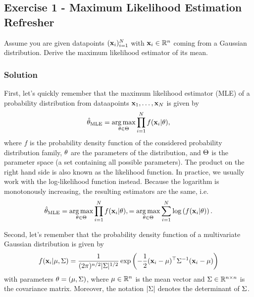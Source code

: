 \documentclass[
  letterpaper,
  DIV=11,
  numbers=noendperiod]{scrartcl}
\author{}
\date{}
\begin{document}
\subsection{Exercise 1 - Maximum Likelihood Estimation
Refresher}\label{exercise-1---maximum-likelihood-estimation-refresher}

Assume you are given datapoints \((\mathbf{x}_i)_{i=1}^N\) with
\(\mathbf{x}_i\in\mathbb{R}^n\) coming from a Gaussian distribution. Derive the maximum
likelihood estimator of its mean.

\subsubsection{Solution}\label{solution}

First, let's quickly remember that the maximum likelihood estimator
(MLE) of a probability distribution from dataapoints
\(\mathbf{x}_1, \ldots, \mathbf{x}_N\) is given by \[
\hat{\theta}_{\mathrm{MLE}} = \operatorname*{arg\,max}_{\theta \in \Theta} \prod_{i=1}^N f(\mathbf{x}_i | \theta),
\] where \(f\) is the probability density function of the considered
probability distribution family, \(\theta\) are the parameters of the
distribution, and \(\Theta\) is the parameter space (a set containing all
possible parameters). The product on the right hand side is also known
as the likelihood function. In practice, we usually work with the
log-likelihood function instead. Because the logarithm is monotonously
increasing, the resulting estimators are the same, i.e. \[
\hat{\theta}_{\mathrm{MLE}} 
 = \operatorname*{arg\,max}_{\theta \in \Theta} \prod_{i=1}^N f(\mathbf{x}_i | \theta),
 = \operatorname*{arg\,max}_{\theta \in \Theta} \sum_{i=1}^N \log \left( f(\mathbf{x}_i | \theta)\right).
\]

Second, let's remember that the probability density function of a
multivariate Gaussian distribution is given by \[
f(\mathbf{x}_i | \mu, \Sigma) 
 = \frac{1}{(2 \pi)^{n/2} |\Sigma|^{1/2}} 
   \exp \left( 
     - \frac{1}{2} 
     (\mathbf{x}_i - \mu)^\top
     \Sigma^{-1} 
     (\mathbf{x}_i - \mu) 
   \right) 
\] with parameters \(\theta=(\mu, \Sigma)\), where \(\mu\in\mathbb{R}^n\) is the mean
vector and \(\Sigma\in\mathbb{R}^{n\times n}\) is the covariance matrix. Moreover,
the notation \(|\Sigma|\) denotes the determinant of \(\Sigma\).
\end{document}
